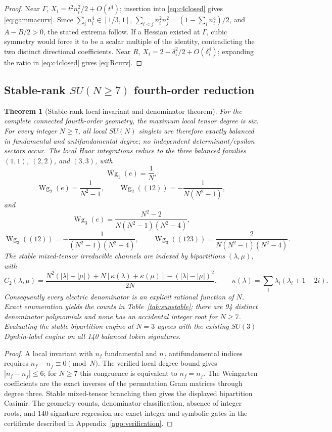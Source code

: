 \documentclass[11pt]{article}
\newtheorem{theorem}{Theorem}[section]
\begin{document}
\begin{proof}
Near $\Gamma$, $X_i=t^2n_i^2/2+O(t^4)$; insertion into
\eqref{eq:c4closed} gives \eqref{eq:gammacurv}. Since
$\sum_i n_i^4\in[1/3,1]$,
$\sum_{i<j}n_i^2n_j^2=(1-\sum_i n_i^4)/2$, and $A-B/2>0$, the stated
extrema follow.
If a Hessian existed at $\Gamma$, cubic symmetry would force it to be a
scalar multiple of the identity, contradicting the two distinct directional
coefficients. Near $R$, $X_i=2-\delta_i^2/2+O(\delta_i^4)$; expanding the
ratio in \eqref{eq:c4closed} gives \eqref{eq:Rcurv}.
\end{proof}


\subsection{Stable-rank $SU(N\geq7)$ fourth-order reduction}
\label{subsec:sunstable}

\begin{theorem}[Stable-rank local-invariant and denominator theorem]
\label{thm:sunstable}
For the complete connected fourth-order geometry, the maximum local tensor
degree is six. For every integer $N\geq7$, all local $SU(N)$ singlets are
therefore exactly balanced in fundamental and antifundamental degree; no
independent determinant/epsilon sectors occur. The local Haar integrations
reduce to the three balanced families $(1,1)$, $(2,2)$, and $(3,3)$, with
\[
\operatorname{Wg}_1(e)=\frac1N,
\]
\[
\operatorname{Wg}_2(e)=\frac1{N^2-1},\qquad
\operatorname{Wg}_2((12))=-\frac1{N(N^2-1)},
\]
and
\[
\operatorname{Wg}_3(e)=\frac{N^2-2}{N(N^2-1)(N^2-4)},
\]
\[
\operatorname{Wg}_3((12))=-\frac1{(N^2-1)(N^2-4)},\qquad
\operatorname{Wg}_3((123))=\frac2{N(N^2-1)(N^2-4)}.
\]
The stable mixed-tensor irreducible channels are indexed by bipartitions
$(\lambda,\mu)$, with
\[
C_2(\lambda,\mu)=
\frac{N^2(|\lambda|+|\mu|)
+N[\kappa(\lambda)+\kappa(\mu)]
-(|\lambda|-|\mu|)^2}{2N},
\qquad
\kappa(\lambda)=\sum_i\lambda_i(\lambda_i+1-2i).
\]
Consequently every electric denominator is an explicit rational function of
$N$. Exact enumeration yields the counts in Table~\ref{tab:sunstable}; there
are 94 distinct denominator polynomials and none has an accidental integer
root for $N\geq7$. Evaluating the stable bipartition engine at $N=3$ agrees
with the existing $SU(3)$ Dynkin-label engine on all 140 balanced token
signatures.
\end{theorem}

\begin{proof}
A local invariant with $n_f$ fundamental and $n_{\bar f}$ antifundamental
indices requires
$n_f-n_{\bar f}\equiv0\pmod N$. The verified local degree bound gives
$|n_f-n_{\bar f}|\leq6$; for $N\geq7$ this congruence is equivalent to
$n_f=n_{\bar f}$. The Weingarten coefficients are the exact inverses of the
permutation Gram matrices through degree three. Stable mixed-tensor branching
then gives the displayed bipartition Casimir. The geometry counts,
denominator classification, absence of integer roots, and 140-signature
regression are exact integer and symbolic gates in the certificate described
in Appendix~\ref{app:verification}.
\end{proof}
\end{document}
